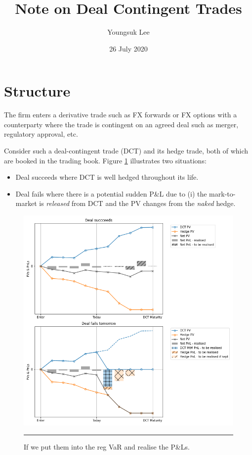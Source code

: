 \documentclass[10pt,a4paper]{article}
\begin{document}
\title{Note on Deal Contingent Trades}
\author{Youngsuk Lee}
\date{26 July 2020}
\maketitle

\section{Structure}

The firm enters a derivative trade such as FX forwards or FX options with a counterparty where the trade is contingent on an agreed deal such as merger, regulatory approval, etc. 

Consider such a deal-contingent trade (DCT) and its hedge trade, both of which are booked in the trading book. Figure 
\ref{fig:dct-illustration} illustrates two situations:
\begin{itemize}
	\item Deal succeeds where DCT is well hedged throughout its life.  
	\item Deal fails where there is a potential sudden P\&L due to (i) the mark-to-market is {\em released} from DCT and 
	the PV changes from the {\em naked} hedge. 
\end{itemize}

\begin{figure}[h!]
	\begin{center}
		\includegraphics[width=16cm]{figs/dct-illustration.png}
	\end{center}
	\caption{If we put them into the reg VaR and realise the P\&Ls. 
	}
	\label{fig:dct-illustration}	
	\hrule
\end{figure}
\end{document}
